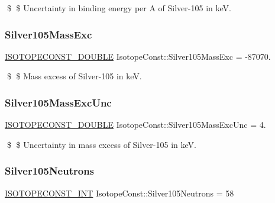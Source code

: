 \$ \$ Uncertainty in binding energy per A of Silver-\/105 in keV. \mbox{\label{group___isotope_const-_silver-_ag105_gaebb7a2e825b841b8d2c25c24cf08e49f}} 
\subsubsection{\texorpdfstring{Silver105\+Mass\+Exc}{Silver105MassExc}}
{\footnotesize\ttfamily \mbox{\hyperlink{group___isotope_const-_macros_ga8f45a7272ce02c0b4c65c44636ed719a}{I\+S\+O\+T\+O\+P\+E\+C\+O\+N\+S\+T\+\_\+\+D\+O\+U\+B\+LE}} Isotope\+Const\+::\+Silver105\+Mass\+Exc = -\/87070.}

\$ \$ Mass excess of Silver-\/105 in keV. \mbox{\label{group___isotope_const-_silver-_ag105_ga3d611c8d8a7baeff85e5d5b6eef0a1f8}} 
\subsubsection{\texorpdfstring{Silver105\+Mass\+Exc\+Unc}{Silver105MassExcUnc}}
{\footnotesize\ttfamily \mbox{\hyperlink{group___isotope_const-_macros_ga8f45a7272ce02c0b4c65c44636ed719a}{I\+S\+O\+T\+O\+P\+E\+C\+O\+N\+S\+T\+\_\+\+D\+O\+U\+B\+LE}} Isotope\+Const\+::\+Silver105\+Mass\+Exc\+Unc = 4.}

\$ \$ Uncertainty in mass excess of Silver-\/105 in keV. \mbox{\label{group___isotope_const-_silver-_ag105_gae26c9d9d303bd324df5fae01cbc95d75}} 
\subsubsection{\texorpdfstring{Silver105\+Neutrons}{Silver105Neutrons}}
{\footnotesize\ttfamily \mbox{\hyperlink{group___isotope_const-_macros_ga5f18360b3e99483a35c32d789e62621c}{I\+S\+O\+T\+O\+P\+E\+C\+O\+N\+S\+T\+\_\+\+I\+NT}} Isotope\+Const\+::\+Silver105\+Neutrons = 58}

